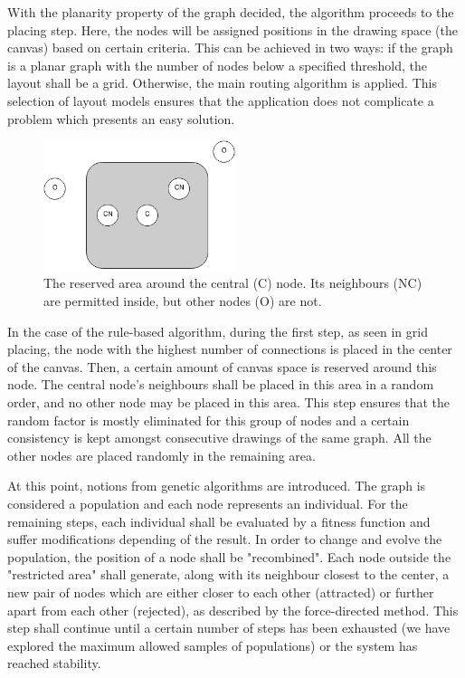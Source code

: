 \begin{itemize}
With the planarity property of the graph decided, the algorithm proceeds to the placing step. Here, the nodes will be assigned positions in the 
drawing space (the canvas) based on certain criteria. This can be achieved in two ways: if the graph is a planar graph with the number of nodes 
below a specified threshold, the layout shall be a grid. Otherwise, the main routing algorithm is applied. This selection of layout models ensures 
that the application does not complicate a problem which presents an easy solution.

\begin{figure}[ht] \centering
\includegraphics[width=0.5\textwidth]{img/algdesing/centralnode.png}
\caption{The reserved area around the central (C) node. Its neighbours (NC) are permitted inside, but other nodes (O) are not.} \end{figure}

In the case of the rule-based algorithm, during the first step, as seen in grid placing, the node with the highest number of connections is 
placed in the center of the canvas. Then, a certain amount of canvas space is reserved around this node. The central node's neighbours 
shall be placed in this area in a random order, and no other node may be placed in this area. This step ensures that the random factor is mostly eliminated 
 for this group of nodes and a certain consistency is kept amongst consecutive drawings of the same graph. All the other nodes are placed randomly in the remaining area.

At this point, notions from genetic algorithms are introduced. The graph is considered a population and each node represents an individual. For the 
remaining steps, each individual shall be evaluated by a fitness function and suffer modifications depending of the result. In order to change and evolve 
the population, the position of a node shall be "recombined". Each node outside the "restricted area" shall generate, along with its neighbour closest to 
the center, a new pair of nodes which are either closer to each other (attracted) or further apart from each other (rejected), as described by the force-directed method. This step shall 
continue until a certain number of steps has been exhausted (we have explored the maximum allowed samples of populations) or the system has reached stability.


\end{itemize}
